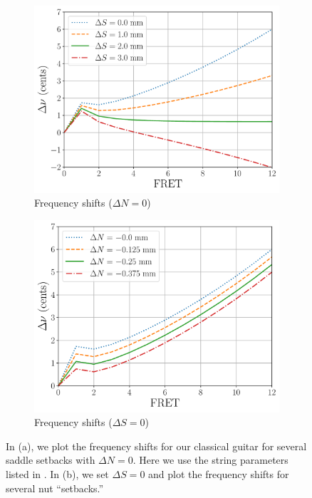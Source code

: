 \begin{figure}
    \centering
    \begin{subfigure}[b]{0.8\textwidth}
        \centering
        \includegraphics[width=5.0in]{figures/comp_ds}
        \caption{Frequency shifts ($\Delta N = 0$)}
        \label{fig:comp_ds}
    \end{subfigure}
    \par\vspace{0.25in}
    \begin{subfigure}[b]{0.8\textwidth}
        \centering
        \includegraphics[width=5.0in]{figures/comp_dn}
        \caption{Frequency shifts ($\Delta S = 0$)}
        \label{fig:comp_dn}
    \end{subfigure}
    \caption{\label{fig:comp_dsdn} In (a), we plot the frequency shifts for our classical guitar for several saddle setbacks with $\Delta N = 0$. Here we use the string parameters listed in . In (b), we set $\Delta S = 0$ and plot the frequency shifts for several nut ``setbacks.''}
  \end{figure}
  

